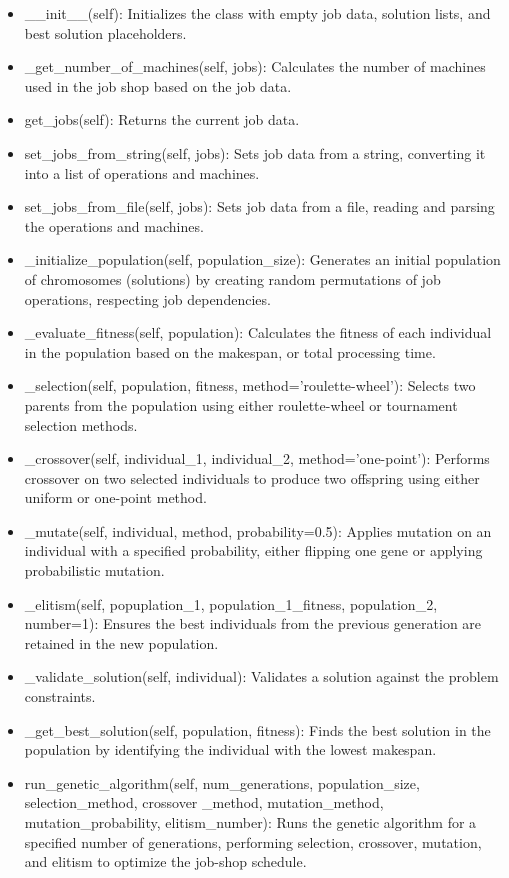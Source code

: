 \documentclass[11pt, a4paper]{article}
\begin{document}
\begin{itemize}
    \item \_\_init\_\_(self): Initializes the class with empty job data, solution lists, and best solution placeholders.
    \item \_get\_number\_of\_machines(self, jobs): Calculates the number of machines used in the job shop based on the job data.
    \item get\_jobs(self): Returns the current job data.
    \item set\_jobs\_from\_string(self, jobs): Sets job data from a string, converting it into a list of operations and machines.
    \item set\_jobs\_from\_file(self, jobs): Sets job data from a file, reading and parsing the operations and machines.
    \item \_initialize\_population(self, population\_size): Generates an initial population of chromosomes (solutions) by creating random permutations of job operations, respecting job dependencies.
    \item \_evaluate\_fitness(self, population): Calculates the fitness of each individual in the population based on the makespan, or total processing time.
    \item \_selection(self, population, fitness, method='roulette-wheel'): Selects two parents from the population using either roulette-wheel or tournament selection methods.
    \item \_crossover(self, individual\_1, individual\_2, method='one-point'): Performs crossover on two selected individuals to produce two offspring using either uniform or one-point method.
    \item \_mutate(self, individual, method, probability=0.5): Applies mutation on an individual with a specified probability, either flipping one gene or applying probabilistic mutation.
    \item \_elitism(self, popuplation\_1, population\_1\_fitness, population\_2, number=1): Ensures the best individuals from the previous generation are retained in the new population.
    \item \_validate\_solution(self, individual): Validates a solution against the problem constraints.
    \item \_get\_best\_solution(self, population, fitness): Finds the best solution in the population by identifying the individual with the lowest makespan.
    \item run\_genetic\_algorithm(self, num\_generations, population\_size, selection\_method, crossover \_method, mutation\_method, mutation\_probability, elitism\_number): Runs the genetic algorithm for a specified number of generations, performing selection, crossover, mutation, and elitism to optimize the job-shop schedule.
\end{itemize}
\end{document}
